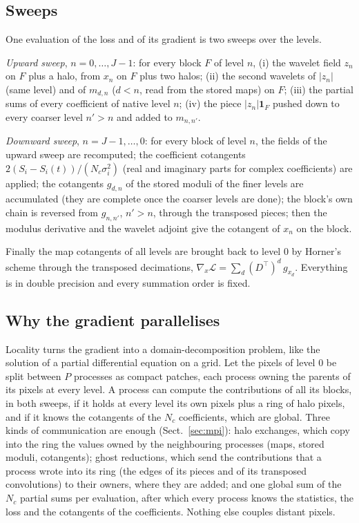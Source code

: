 \documentclass{aa}
\begin{document}
\subsection{Sweeps}
\label{sec:sweeps}

One evaluation of the loss and of its gradient is two sweeps over the levels.

\emph{Upward sweep}, $n = 0, \dots, J-1$: for every block $F$ of level $n$, (i) the wavelet field $z_n$ on $F$ plus a halo, from $x_n$ on $F$ plus two halos; (ii) the second wavelets of $|z_n|$ (same level) and of $m_{d,n}$ ($d<n$, read from the stored maps) on $F$; (iii) the partial sums of every coefficient of native level $n$; (iv) the piece $|z_n|\mathbf{1}_F$ pushed down to every coarser level $n'>n$ and added to $m_{n,n'}$.

\emph{Downward sweep}, $n = J-1, \dots, 0$: for every block of level $n$, the fields of the upward sweep are recomputed; the coefficient cotangents $2(S_i - S_i(t))/(N_c\sigma_i^2)$ (real and imaginary parts for complex coefficients) are applied; the cotangents $g_{d,n}$ of the stored moduli of the finer levels are accumulated (they are complete once the coarser levels are done); the block's own chain is reversed from $g_{n,n'}$, $n'>n$, through the transposed pieces; then the modulus derivative and the wavelet adjoint give the cotangent of $x_n$ on the block.

Finally the map cotangents of all levels are brought back to level 0 by Horner's scheme through the transposed decimations, $\nabla_x\mathcal{L} = \sum_d (D^\top)^d\,g_{x_d}$. Everything is in double precision and every summation order is fixed.

\subsection{Why the gradient parallelises}
\label{sec:parallel}

Locality turns the gradient into a domain-decomposition problem, like the solution of a partial differential equation on a grid. Let the pixels of level 0 be split between $P$ processes as compact patches, each process owning the parents of its pixels at every level. A process can compute the contributions of all its blocks, in both sweeps, if it holds at every level its own pixels plus a ring of halo pixels, and if it knows the cotangents of the $N_c$ coefficients, which are global. Three kinds of communication are enough (Sect.~\ref{sec:mpi}): halo exchanges, which copy into the ring the values owned by the neighbouring processes (maps, stored moduli, cotangents); ghost reductions, which send the contributions that a process wrote into its ring (the edges of its pieces and of its transposed convolutions) to their owners, where they are added; and one global sum of the $N_c$ partial sums per evaluation, after which every process knows the statistics, the loss and the cotangents of the coefficients. Nothing else couples distant pixels.
\end{document}
